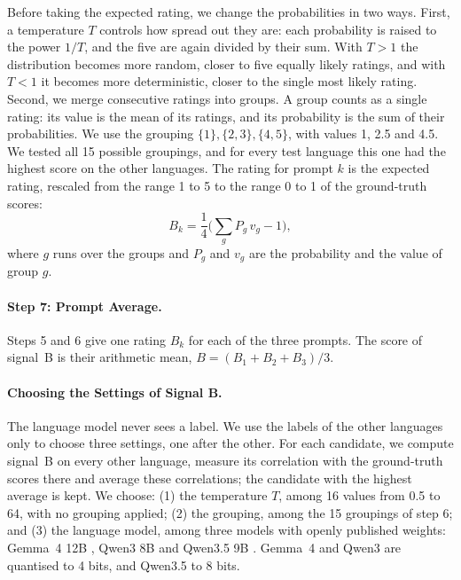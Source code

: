 \documentclass[11pt]{article}
\begin{document}
Before taking the expected rating, we change the probabilities in two ways. First, a temperature
$T$ controls how spread out they are: each probability is raised to the power $1/T$, and the five %
are again divided by their sum. With $T > 1$ the distribution becomes more random, closer to five
equally likely ratings, and with $T < 1$ it becomes more deterministic, closer to the single most
likely rating. Second, we merge consecutive ratings into groups. A group counts as a single %
rating: its value is the mean of its ratings, and its probability is the sum of their
probabilities. We use the grouping $\{1\}, \{2, 3\}, \{4, 5\}$, with values 1, 2.5 and 4.5. We %
tested all 15 possible groupings, and for every test language this one had the highest score on %
the other languages. The rating for prompt $k$ is the expected rating, rescaled from the
range 1 to 5 to the range 0 to 1 of the ground-truth scores:
\begin{equation}
B_k = \frac{1}{4}\Big(\sum_{g} P_g\, v_g - 1\Big),
\label{eq:rating}
\end{equation}
where $g$ runs over the groups and $P_g$ and $v_g$ are the probability and the value of group $g$. %

\paragraph{Step 7: Prompt Average.} Steps 5 and 6 give one rating $B_k$ for each of the three %
prompts. The score of signal~B is their arithmetic mean, $B = (B_1 + B_2 + B_3)/3$.

\paragraph{Choosing the Settings of Signal B.} The language model never sees a label. We use the %
labels of the other languages only to choose three settings, one after the other. For each
candidate, we compute signal~B on every other language, measure its correlation with the
ground-truth scores there and average these correlations; the candidate with the highest average
is kept. We
choose: (1) the temperature $T$, among 16 values from 0.5 to 64, with no grouping applied; (2) the %
grouping,
among the 15 groupings of step 6; and (3) %
 the language model, among three models with openly published %
weights: Gemma~4 12B \citep{gemmateam-2026-gemma4}, Qwen3 8B \citep{yang-etal-2025-qwen3} and %
Qwen3.5 9B \citep{qwen-team-2026-qwen35}. Gemma~4 and Qwen3 are quantised to 4 bits, and Qwen3.5 to 8 bits. %
\end{document}
